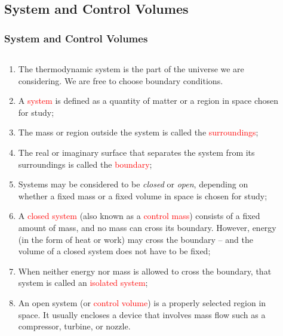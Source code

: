 \documentclass[10pt,compress,handout,ignorenonframetext]{beamer}
\begin{document}
\subsection{System and Control Volumes} 

\scriptsize
\begin{frame}
 \frametitle{System and Control Volumes}
  \begin{columns}
    \begin{column}[l]{0.6\linewidth}
      \begin{enumerate}\scriptsize
       \item <1-> The thermodynamic system is the part of the universe we are considering. We are free to choose boundary conditions.
       \item <2-> A \textcolor{red}{system} is defined as a quantity of matter or a region in space chosen for study;
       \item <3-> The mass or region outside the system is called the \textcolor{red}{surroundings};
       \item <4-> The real or imaginary surface that separates the system from its surroundings is called the \textcolor{red}{boundary};
       \item <5-> Systems may be considered to be {\it closed} or {\it open}, depending on whether a fixed mass or a fixed volume in space is chosen for study; 
       \item <6-> A \textcolor{red}{closed system} (also known as a \textcolor{red}{control mass}) consists of a fixed amount of mass, and no mass can cross its boundary. However, energy (in the form of heat or work) may cross the boundary -- and the volume of a closed system does not have to be fixed; 
       \item <7-> When neither energy nor mass is allowed to cross the boundary, that system is called an \textcolor{red}{isolated system};
       \item <8-> An open system (or \textcolor{red}{control volume}) is a properly selected region in space. It usually encloses a device that involves mass flow such as a compressor, turbine, or nozzle.
      \end{enumerate} 
    \end{column}
    \begin{column}[l]{0.4\linewidth}\scriptsize
      \begin{figure}%
        \begin{center}

\end{center}
\end{figure}
\end{column}
\end{columns}
\end{frame}
\end{document}
